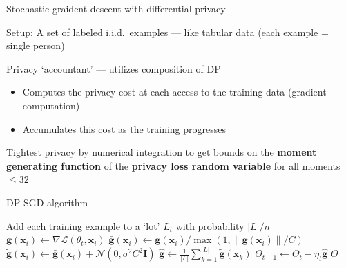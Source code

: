 \documentclass[12pt,aspectratio=169,handout]{beamer}
\begin{document}
\begin{frame}{Stochastic graident descent with differential privacy}

Setup: A set of labeled i.i.d.\ examples --- like tabular data (each example = single person)

Privacy `accountant' --- utilizes composition of DP
\begin{itemize}
	\item Computes the privacy cost at each access to the training data (gradient computation)
	\item Accumulates this cost as the training progresses
\end{itemize}

Tightest privacy by numerical integration to get bounds on the \textbf{moment generating function} of the \textbf{privacy loss random variable} for all moments $\leq 32$



\end{frame}


\begin{frame}{DP-SGD algorithm}
	
\begin{minipage}[t][10cm][t]{15cm}

\begin{algorithmic}[1]
\State Add each training example to a `lot' $L_t$ with probability $|L|/n$
\State $\bm{g}(\bm{x}_i) \gets \nabla \mathcal{L} (\theta_t, \bm{x}_i)$
\State
$\bar{\bm{g}}(\bm{x}_i) \gets \bm{g}(\bm{x}_i) / \max \left(1 , \|  \bm{g}(\bm{x}_i) \| / C \right)
$
\State $\tilde{\bm{g}}(\bm{x}_i) \gets \bar{\bm{g}}(\bm{x}_i) + \mathcal{N}(0, \sigma^2 C^2 \bm{I})$
\EndFor
\State $\hat{\bm{g}} \gets \frac{1}{|L|} \sum_{k = 1}^{|L|} \tilde{\bm{g}}(\bm{x}_k)$
\State $\Theta_{t + 1} \gets \Theta_t - \eta_t \hat{\bm{g}}$
\EndFor
\State \Return $\Theta$
\EndFunction
\end{algorithmic}

\end{minipage}
	
\end{frame}
\end{document}

